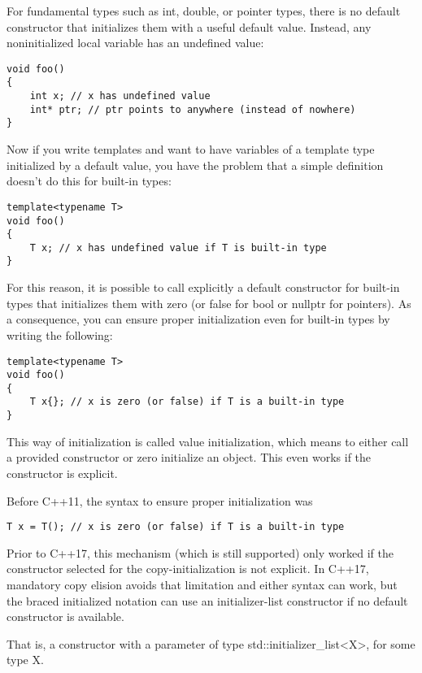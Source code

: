 For fundamental types such as int, double, or pointer types, there is no default constructor that initializes them with a useful default value. Instead, any noninitialized local variable has an undefined value:

\begin{lstlisting}[style=styleCXX]
void foo()
{
	int x; // x has undefined value
	int* ptr; // ptr points to anywhere (instead of nowhere)
}
\end{lstlisting}

Now if you write templates and want to have variables of a template type initialized by a default value, you have the problem that a simple definition doesn’t do this for built-in types:

\begin{lstlisting}[style=styleCXX]
template<typename T>
void foo()
{
	T x; // x has undefined value if T is built-in type
}
\end{lstlisting}

For this reason, it is possible to call explicitly a default constructor for built-in types that initializes them with zero (or false for bool or nullptr for pointers). As a consequence, you can ensure proper initialization even for built-in types by writing the following:

\begin{lstlisting}[style=styleCXX]
template<typename T>
void foo()
{
	T x{}; // x is zero (or false) if T is a built-in type
}
\end{lstlisting}

This way of initialization is called value initialization, which means to either call a provided constructor or zero initialize an object. This even works if the constructor is explicit.

Before C++11, the syntax to ensure proper initialization was

\begin{lstlisting}[style=styleCXX]
T x = T(); // x is zero (or false) if T is a built-in type
\end{lstlisting}

Prior to C++17, this mechanism (which is still supported) only worked if the constructor selected for the copy-initialization is not explicit. In C++17, mandatory copy elision avoids that limitation and either syntax can work, but the braced initialized notation can use an initializer-list constructor if no default constructor is available.

\begin{tcolorbox}[colback=webgreen!5!white,colframe=webgreen!75!black]
\hspace*{0.75cm}That is, a constructor with a parameter of type std::initializer\_list<X>, for some type X.
\end{tcolorbox}

